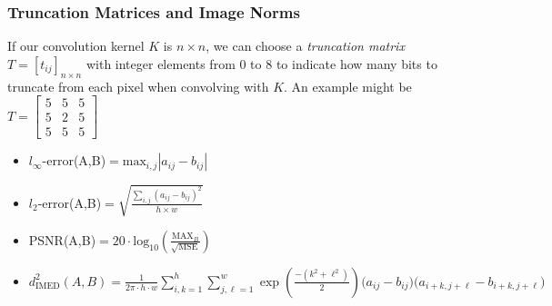 \documentclass{beamer}
\begin{document}
\begin{frame}\frametitle{Truncation Matrices and Image Norms}
If our convolution kernel $K$ is $n\times n$, we can choose a \emph{truncation matrix} $T = [t_{ij}]_{n\times n}$ with integer elements from 0 to 8 to indicate how many bits to truncate from each pixel when convolving with $K$. An example might be $T = \left[\begin{smallmatrix}5 & 5 & 5\\ 5 & 2 & 5\\ 5 & 5 & 5\end{smallmatrix}\right]$


\pause\begin{definition}
\begin{itemize}
\item[]
$l_{\infty}$-error(A,B)$=\textrm{max}_{i,j} | a_{ij} - b_{ij}|$
\item[]
$l_2$-error(A,B)$=\sqrt{ \frac{ \sum_{i,j} \left( a_{ij} - b_{ij} \right)^2} {h \times w}}$
\item []
PSNR(A,B)$=20 \cdot \textrm{log}_{10} ( \frac{\textrm{MAX}_B}{\sqrt{\textrm{MSE}}} )$
\item[] $d_\text{IMED}^2(A,B) = \frac{1}{2\pi\cdot h\cdot w}\sum_{i,k = 1}^h\sum_{j,\ell = 1}^w \exp\left(\frac{-(k^2+\ell^2)}{2}\right)\big(a_{ij}-b_{ij}\big)\big(a_{i+k,j+\ell} - b_{i+k,j+\ell}\big)$
\end{itemize}
\end{definition}
\end{frame}
\end{document}
